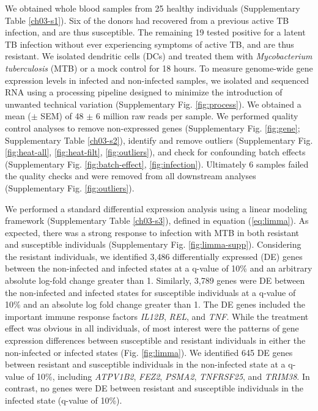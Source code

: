 We obtained whole blood samples from 25 healthy individuals
(Supplementary Table \ref{ch03-s1}). Six of the donors had recovered
from a previous active TB infection, and are thus susceptible. The
remaining 19 tested positive for a latent TB infection without ever
experiencing symptoms of active TB, and are thus resistant. We
isolated dendritic cells (DCs) and treated them with
\emph{Mycobacterium }\emph{tuberculosis} (MTB) or a mock control for
18 hours. To measure genome-wide gene expression levels in infected
and non-infected samples, we isolated and sequenced RNA using a
processing pipeline designed to minimize the introduction of unwanted
technical variation (Supplementary Fig. \ref{fig:process}). We
obtained a mean ($\pm$ SEM) of 48 $\pm$ 6 million raw reads per
sample. We performed quality control analyses to remove non-expressed
genes (Supplementary Fig.  \ref{fig:gene}; Supplementary Table
\ref{ch03-s2}), identify and remove outliers (Supplementary
Fig. \ref{fig:heat-all}, \ref{fig:heat-filt}, \ref{fig:outliers}), and
check for confounding batch effects (Supplementary
Fig. \ref{fig:batch-effect}, \ref{fig:infection}). Ultimately 6
samples failed the quality checks and were removed from all downstream
analyses (Supplementary Fig. \ref{fig:outliers}).

We performed a standard differential expression analysis using a
linear modeling framework (Supplementary Table \ref{ch03-s3}), defined
in equation (\ref{eq:limma}). As expected, there was a strong response
to infection with MTB in both resistant and susceptible individuals
(Supplementary Fig. \ref{fig:limma-supp}). Considering the resistant
individuals, we identified 3,486 differentially expressed (DE) genes
between the non-infected and infected states at a q-value of 10\% and
an arbitrary absolute log-fold change greater than 1. Similarly, 3,789
genes were DE between the non-infected and infected states for
susceptible individuals at a q-value of 10\% and an absolute log fold
change greater than 1. The DE genes included the important immune
response factors \emph{IL12B}, \emph{REL}, and \emph{TNF}. While the
treatment effect was obvious in all individuals, of most interest were
the patterns of gene expression differences between susceptible and
resistant individuals in either the non-infected or infected states
(Fig. \ref{fig:limma}). We identified 645 DE genes between resistant
and susceptible individuals in the non-infected state at a q-value of
10\%, including \emph{ATPV1B2}, \emph{FEZ2}, \emph{PSMA2},
\emph{TNFRSF25}, and \emph{TRIM38}. In contrast, no genes were DE
between resistant and susceptible individuals in the infected state
(q-value of 10\%).

